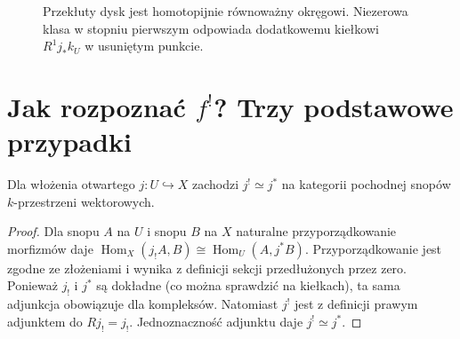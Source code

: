 \begin{figure}[htbp]
\centering
{}
\caption{Przekłuty dysk jest homotopijnie równoważny okręgowi.
Niezerowa klasa w stopniu pierwszym odpowiada
dodatkowemu kiełkowi $R^1j_*k_U$ w usuniętym punkcie.}
\label{fig:xvi-punctured-disc-audit}
\end{figure}

\section{Jak rozpoznać $f^!$? Trzy podstawowe przypadki}
\begin{stwierdzenie}
\label{prop:xvi-open-shriek}
Dla włożenia otwartego $j:U\hookrightarrow X$ zachodzi
$j^!\simeq j^*$ na kategorii pochodnej snopów $k$-przestrzeni
wektorowych.
\end{stwierdzenie}
\begin{proof}
Dla snopu $A$ na $U$ i snopu $B$ na $X$ naturalne
przyporządkowanie morfizmów daje
$\operatorname{Hom}_X(j_!A,B)\cong
\operatorname{Hom}_U(A,j^*B)$.
Przyporządkowanie jest zgodne ze złożeniami i wynika
z definicji sekcji przedłużonych przez zero.
Ponieważ $j_!$ i $j^*$ są dokładne (co można sprawdzić
na kiełkach), ta sama adjunkcja obowiązuje dla kompleksów.
Natomiast $j^!$ jest z definicji prawym adjunktem do $Rj_!=j_!$.
Jednoznaczność adjunktu daje $j^!\simeq j^*$.
\end{proof}

